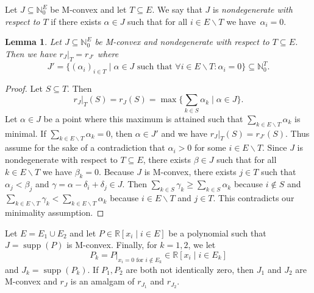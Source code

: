 \documentclass[11pt]{article}
\newtheorem{lem}[theo]{Lemma}
\theoremstyle{definition}
\numberwithin{equation}{section}
\newcommand{\N}{{\mathbb N}}
\newcommand{\R}{{\mathbb R}}
\newcommand{\supp}{\operatorname{supp}}
\begin{document}
\begin{Def}
    Let $J\subseteq\N_0^E$ be M-convex and let $T\subseteq E$. We say that $J$ is \emph{nondegenerate with respect to $T$} if there exists $\alpha\in J$ such that for all $i\in E\smallsetminus T$ we have~$\alpha_i=0$.
\end{Def}

\begin{lem}\label{lem:mconvrest}
    Let $J\subseteq\N_0^E$ be M-convex and nondegenerate with respect to $T\subseteq E$. Then we have $r_J|_T=r_{J'}$ where
    \begin{equation*}
        J'=\{(\alpha_i)_{i\in T}\mid \alpha\in J\textrm{ such that }\forall i\in E\smallsetminus T: \alpha_i=0\}\subseteq\N_0^T.
    \end{equation*}
\end{lem}

\begin{proof}
    Let $S\subseteq T$. Then
    \begin{equation*}
        r_J|_T(S)=r_J(S)=\max\{\sum_{k\in S}\alpha_k\mid \alpha\in J\}.
    \end{equation*}
    Let $\alpha\in J$ be a point where this maximum is attained such that $\sum_{k\in E\smallsetminus T}\alpha_k$ is minimal. If $\sum_{k\in E\smallsetminus T}\alpha_k=0$, then $\alpha\in J'$ and we have $r_J|_T(S)=r_{J'}(S)$. Thus assume for the sake of a contradiction that $\alpha_i>0$ for some $i\in E\smallsetminus T$. Since $J$ is nondegenerate with respect to $T\subseteq E$, there exists $\beta\in J$ such that for all $k\in E\smallsetminus T$ we have $\beta_k=0$. Because $J$ is M-convex, there exists $j\in T$ such that $\alpha_j<\beta_j$ and $\gamma=\alpha-\delta_i+\delta_j\in J$. Then $\sum_{k\in S}\gamma_k\geq\sum_{k\in S}\alpha_k$ because $i\not\in S$ and $\sum_{k\in E\smallsetminus T}\gamma_k<\sum_{k\in E\smallsetminus T}\alpha_k$ because $i\in E\smallsetminus T$ and $j\in T$. This contradicts our minimality assumption.
\end{proof}

\begin{cor}\label{cor:polyamal}
    Let $E=E_1\cup E_2$ and let $P\in\R[x_i\mid i\in E]$ be a polynomial such that $J=\supp(P)$ is M-convex.
    Finally, for $k=1,2$, we let
    \begin{equation*}
        P_k=P|_{x_i=0\textrm{ for }i\not\in E_k}\in \R[x_i\mid i\in E_k]
    \end{equation*}
    and $J_k=\supp(P_k)$. If $P_1,P_2$ are both not identically zero, then $J_1$ and $J_2$ are M-convex and $r_J$ is an amalgam of $r_{J_1}$ and $r_{J_2}$.
\end{cor}
\end{document}
